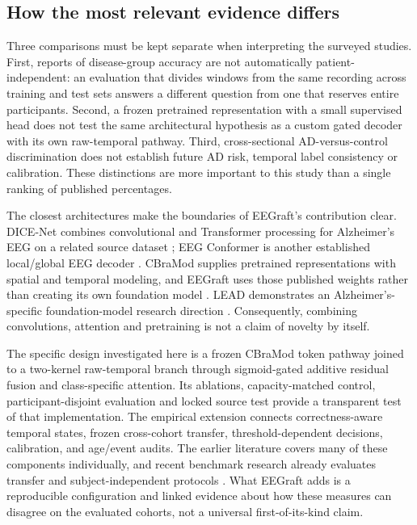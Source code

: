 \subsection*{How the most relevant evidence differs}
Three comparisons must be kept separate when interpreting the surveyed studies. First, reports of disease-group accuracy are not automatically patient-independent: an evaluation that divides windows from the same recording across training and test sets answers a different question from one that reserves entire participants. Second, a frozen pretrained representation with a small supervised head does not test the same architectural hypothesis as a custom gated decoder with its own raw-temporal pathway. Third, cross-sectional AD-versus-control discrimination does not establish future AD risk, temporal label consistency or calibration. These distinctions are more important to this study than a single ranking of published percentages.

The closest architectures make the boundaries of EEGraft's contribution clear. DICE-Net combines convolutional and Transformer processing for Alzheimer's EEG on a related source dataset \cite{dice2023}; EEG Conformer is another established local/global EEG decoder \cite{song2023}. CBraMod supplies pretrained representations with spatial and temporal modeling, and EEGraft uses those published weights rather than creating its own foundation model \cite{wang2025cbramod}. LEAD demonstrates an Alzheimer's-specific foundation-model research direction \cite{wang2026lead}. Consequently, combining convolutions, attention and pretraining is not a claim of novelty by itself.

The specific design investigated here is a frozen CBraMod token pathway joined to a two-kernel raw-temporal branch through sigmoid-gated additive residual fusion and class-specific attention. Its ablations, capacity-matched control, participant-disjoint evaluation and locked source test provide a transparent test of that implementation. The empirical extension connects correctness-aware temporal states, frozen cross-cohort transfer, threshold-dependent decisions, calibration, and age/event audits. The earlier literature covers many of these components individually, and recent benchmark research already evaluates transfer and subject-independent protocols \cite{xiong2026,liu2026compass}. What EEGraft adds is a reproducible configuration and linked evidence about how these measures can disagree on the evaluated cohorts, not a universal first-of-its-kind claim.

